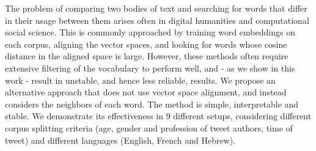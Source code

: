 The problem of comparing two bodies of text and searching for words that differ in their usage between them arises often in digital humanities and computational social science. This is commonly approached by training word embeddings on each corpus, aligning the vector spaces, and looking for words whose cosine distance in the aligned space is large. However, these methods often require extensive filtering of the vocabulary to perform well, and - as we show in this work - result in unstable, and hence less reliable, results. We propose an alternative approach that does not use vector space alignment, and instead considers the neighbors of each word. The method is simple, interpretable and stable. We demonstrate its effectiveness in 9 different setups, considering different corpus splitting criteria (age, gender and profession of tweet authors, time of tweet) and different languages (English, French and Hebrew).
